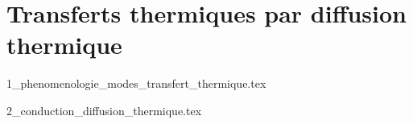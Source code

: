 \chapter{Transferts thermiques par diffusion thermique}

\minitoc 

{1_phenomenologie_modes_transfert_thermique.tex}

{2_conduction_diffusion_thermique.tex}